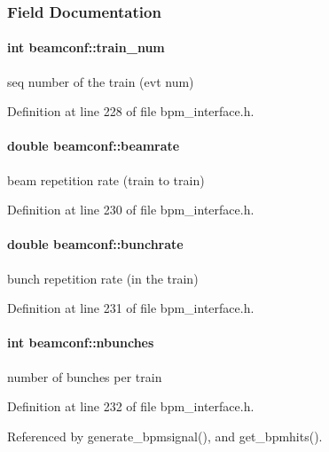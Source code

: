 \subsubsection{Field Documentation}
\paragraph[train\_\-num]{\setlength{\rightskip}{0pt plus 5cm}int {\bf beamconf::train\_\-num}}\hfill\label{structbeamconf_f25a9f8d65fa4f04f9050414e0dcf891}


seq number of the train (evt num) 

Definition at line 228 of file bpm\_\-interface.h.
\paragraph[beamrate]{\setlength{\rightskip}{0pt plus 5cm}double {\bf beamconf::beamrate}}\hfill\label{structbeamconf_9452259b166a06292909dd94e87bf9ae}


beam repetition rate (train to train) 

Definition at line 230 of file bpm\_\-interface.h.
\paragraph[bunchrate]{\setlength{\rightskip}{0pt plus 5cm}double {\bf beamconf::bunchrate}}\hfill\label{structbeamconf_21abb80770607c1d48fef708c5dc4ebd}


bunch repetition rate (in the train) 

Definition at line 231 of file bpm\_\-interface.h.
\paragraph[nbunches]{\setlength{\rightskip}{0pt plus 5cm}int {\bf beamconf::nbunches}}\hfill\label{structbeamconf_3957367666e4d2132d8a662941276f3a}


number of bunches per train 

Definition at line 232 of file bpm\_\-interface.h.

Referenced by generate\_\-bpmsignal(), and get\_\-bpmhits().
